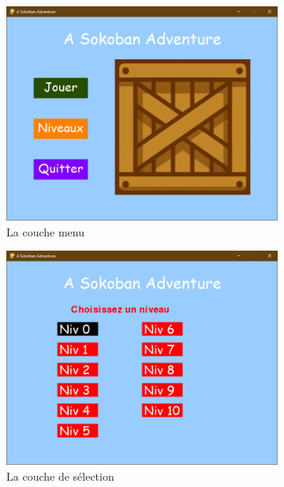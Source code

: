 \documentclass[a4paper,12pt]{article} %
\begin{document}
\begin{figure}[!ht]
	\begin{subfigure}[b]{0.3\textwidth}
		\includegraphics[width=\textwidth]{images/Capture_100726.png}
		\caption{La couche menu}
	\end{subfigure}
	\begin{subfigure}[b]{0.3\textwidth}
		\includegraphics[width=\textwidth]{images/Capture_102044.png}
		\caption{La couche de sélection}
		\end{subfigure}
	\begin{subfigure}[b]{0.3\textwidth}

\end{subfigure}
\end{figure}
\end{document}
